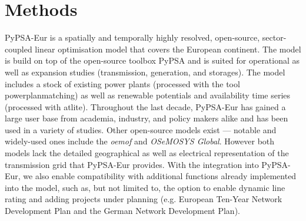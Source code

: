 \documentclass[fleqn,10pt]{wlscirep}
\let\autocite\cite
\begin{document}
\section*{Methods}
PyPSA-Eur is a spatially and temporally highly resolved, open-source, sector-coupled linear optimisation model that covers the European continent.\autocite{horschPyPSAEurOpenOptimisation2018} The model is build on top of the open-source toolbox PyPSA \autocite{brownPyPSAPythonPower2018} and is suited for operational as well as expansion studies (transmission, generation, and storages). The model includes a stock of existing power plants (processed with the tool powerplanmatching\autocite{gotzensPerformingEnergyModelling2019}) as well as renewable potentials and availability time series (processed with atlite\autocite{hofmannAtliteLightweightPython2021}).
Throughout the last decade, PyPSA-Eur has gained a large user base from academia, industry, and policy makers alike and has been used in a variety of studies.\autocite{neumannPotentialRoleHydrogen2023,victoriaSpeedTechnologicalTransformations2022,brownUltralongdurationEnergyStorage2023,glaumOffshorePowerHydrogen2024,riepinMeansCostsSystemlevel2024,rahdanDistributedPhotovoltaicsProvides2024,grochowiczUsingPowerSystem2024,transnetbwStromnetz2050Studie2022} Other open-source models exist --- notable and widely-used ones include the \textit{\gls{oemof}}\autocite{hilpertOpenEnergyModelling2018} and \textit{OSeMOSYS Global}.\autocite{barnesOSeMOSYSGlobalOpensource2022} However both models lack the detailed geographical as well as electrical representation of the transmission grid that PyPSA-Eur provides. With the integration into PyPSA-Eur, we also enable compatibility with additional functions already implemented into the model, such as, but not limited to, the option to enable dynamic line rating\autocite{glaumLeveragingExistingGerman2023} and adding projects under planning (e.g. European Ten-Year Network Development Plan\autocite{entso-eTenYearNetworkDevelopment2020} and the German Network Development Plan\autocite{bnetzaBestaetigungNetzentwicklungsplanStrom2024}).
\end{document}
